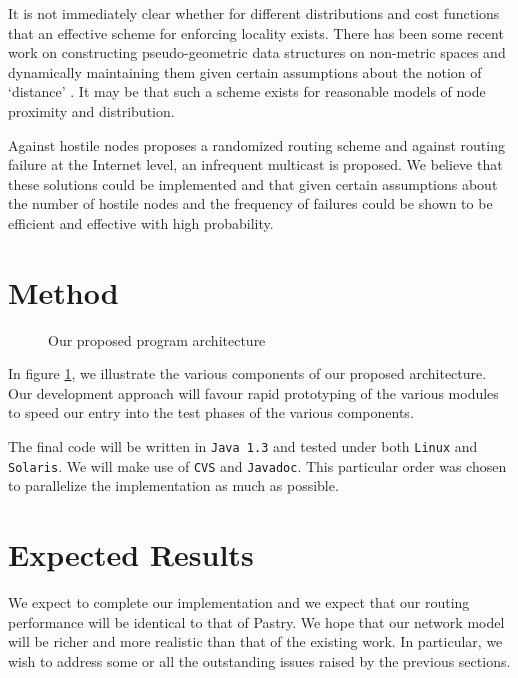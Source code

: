\documentclass{article}
\begin{document}
It is not immediately clear whether for different distributions and
cost functions that an effective scheme for enforcing locality
exists.  There has been some recent work on constructing
pseudo-geometric data structures on non-metric spaces and dynamically
maintaining them given certain assumptions about the notion of
`distance' \cite{GXZ01}.  It may be that such a scheme exists for reasonable models
of node proximity and distribution.

Against hostile nodes \cite{RoD01B} proposes a randomized routing
scheme and against routing failure at the Internet level, an infrequent
multicast is proposed.  We believe that these solutions could be
implemented and that given certain assumptions about the number of
hostile nodes and the frequency of failures could be shown to be
efficient and effective with high probability.

\section{Method}

\begin{figure}[t]
\centerline{}
\caption{Our proposed program architecture} 
\label{fig:structure}
\end{figure}

In figure \ref{fig:structure}, we illustrate the various components
of our proposed architecture.  Our development approach will favour
rapid prototyping of the various modules to speed our entry into the test
phases of the various components.  

The final code will be written in {\tt Java 1.3} and tested under
both {\tt Linux} and {\tt Solaris}.  We will make use of {\tt CVS} and
{\tt Javadoc}. This particular order was chosen to parallelize the
implementation as much as possible.


\section{Expected Results}

We expect to complete our implementation and we expect that our
routing performance will be identical to that of Pastry.  We hope that our
network model will be richer and more realistic than that of the existing
work.   In particular, we wish to address some or all the outstanding
issues raised by the previous sections.
\end{document}
